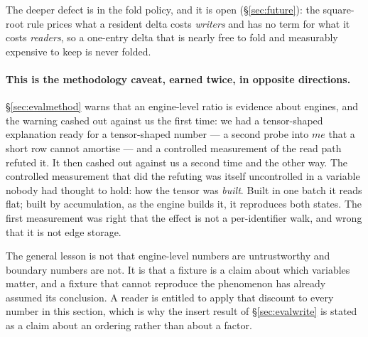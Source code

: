 \documentclass[11pt,a4paper]{article}
\theoremstyle{plain}
\theoremstyle{definition}
\theoremstyle{remark}
\begin{document}
The deeper defect is in the fold policy, and it is open (\S\ref{sec:future}):
the square-root rule prices what a resident delta costs \emph{writers} and has
no term for what it costs \emph{readers}, so a one-entry delta that is nearly
free to fold and measurably expensive to keep is never folded.

\paragraph{This is the methodology caveat, earned twice, in opposite
directions.} \S\ref{sec:evalmethod} warns that an engine-level ratio is evidence
about engines, and the warning cashed out against us the first time: we had a
tensor-shaped explanation ready for a tensor-shaped number --- a second probe
into $me$ that a short row cannot amortise --- and a controlled measurement of
the read path refuted it. It then cashed out against us a second time and the
other way. The controlled measurement that did the refuting was itself
uncontrolled in a variable nobody had thought to hold: how the tensor was
\emph{built}. Built in one batch it reads flat; built by accumulation, as the
engine builds it, it reproduces both states. The first measurement was right that
the effect is not a per-identifier walk, and wrong that it is not edge storage.

The general lesson is not that engine-level numbers are untrustworthy and
boundary numbers are not. It is that a fixture is a claim about which variables
matter, and a fixture that cannot reproduce the phenomenon has already assumed
its conclusion. A reader is entitled to apply that discount to every number in
this section, which is why the insert result of \S\ref{sec:evalwrite} is stated
as a claim about an ordering rather than about a factor.
\end{document}
